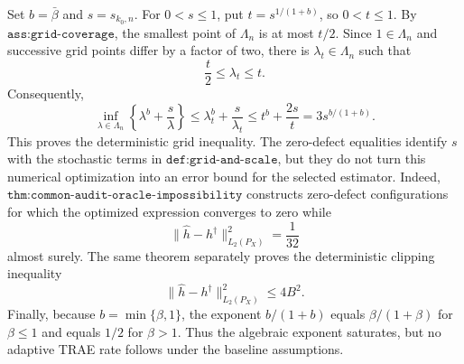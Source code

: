 Set \(b=\bar\beta\) and \(s=s_{k_0,n}\). For \(0<s\le1\), put \(t=s^{1/(1+b)}\), so \(0<t\le1\). By \(\texttt{ass:grid-coverage}\), the smallest point of \(\Lambda_n\) is at most \(t/2\). Since \(1\in\Lambda_n\) and successive grid points differ by a factor of two, there is \(\lambda_t\in\Lambda_n\) such that
\[
 \frac{t}{2}\le\lambda_t\le t.
\]
Consequently,
\[
 \inf_{\lambda\in\Lambda_n}
 \left\{\lambda^b+\frac{s}{\lambda}\right\}
 \le \lambda_t^b+\frac{s}{\lambda_t}
 \le t^b+\frac{2s}{t}
 =3s^{b/(1+b)}.
\]
This proves the deterministic grid inequality. The zero-defect equalities identify \(s\) with the stochastic terms in \(\texttt{def:grid-and-scale}\), but they do not turn this numerical optimization into an error bound for the selected estimator. Indeed, \(\texttt{thm:common-audit-oracle-impossibility}\) constructs zero-defect configurations for which the optimized expression converges to zero while
\[
 \|\widehat h-h^\dagger\|_{L_2(P_X)}^2=\frac{1}{32}
\]
almost surely. The same theorem separately proves the deterministic clipping inequality
\[
 \|\widehat h-h^\dagger\|_{L_2(P_X)}^2\le4B^2.
\]
Finally, because \(b=\min\{\beta,1\}\), the exponent \(b/(1+b)\) equals \(\beta/(1+\beta)\) for \(\beta\le1\) and equals \(1/2\) for \(\beta>1\). Thus the algebraic exponent saturates, but no adaptive TRAE rate follows under the baseline assumptions.